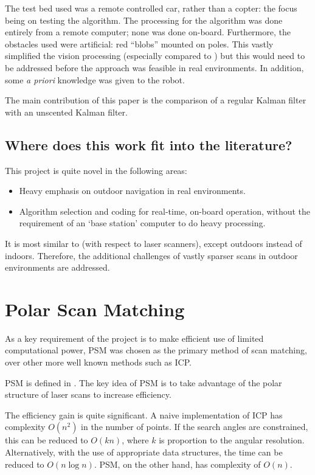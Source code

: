 \documentclass[12pt,oneside,a4paper,draft]{book}
\begin{document}
The test bed used was a remote controlled car, rather than a copter:
the focus being on testing the algorithm. The processing for the
algorithm was done entirely from a remote computer; none was done
on-board. Furthermore, the obstacles used were artificial: red
``blobs'' mounted on poles. This vastly simplified the vision
processing (especially compared to \cite{5152680}) but this would need
to be addressed before the approach was feasible in real
environments. In addition, some \emph{a priori}
knowledge was given to the robot.

The main contribution of this paper is the comparison of a regular
Kalman filter with an unscented Kalman filter. 
 
\subsection{Where does this work fit into the literature?}
\label{sec:where-does-this}

This project is quite novel in the following areas:
\begin{itemize}
\item Heavy emphasis on outdoor navigation in real environments.
\item Algorithm selection and coding for real-time, on-board
  operation, without the requirement of an `base station' computer to
  do heavy processing.
\end{itemize}

It is most similar to \cite{achtelik2009stereo} (with respect to laser
scanners), except outdoors instead of indoors. Therefore, the
additional challenges of vastly sparser scans in outdoor environments
are addressed.

\section{Polar Scan Matching}
\label{sec:polar-scan-matching}

As a key requirement of the project is to make efficient use of
limited computational power, \gls{PSM} was chosen as the
primary method of scan matching, over other more well known methods
such as \gls{ICP}.

PSM is defined in \cite{polarscanmatching}. The key idea of PSM is to
take advantage of the polar structure of laser scans to increase
efficiency. 

The efficiency gain is quite significant. A naive implementation of
ICP has complexity $O(n^2)$ in the number of points. If the search
angles are constrained, this can be reduced to $O(kn)$, where $k$ is
proportion to the angular resolution. Alternatively, with the
use of appropriate data structures, the time can be reduced to
$O(n\log n)$. PSM, on the other hand, has complexity of $O(n)$.
\end{document}
